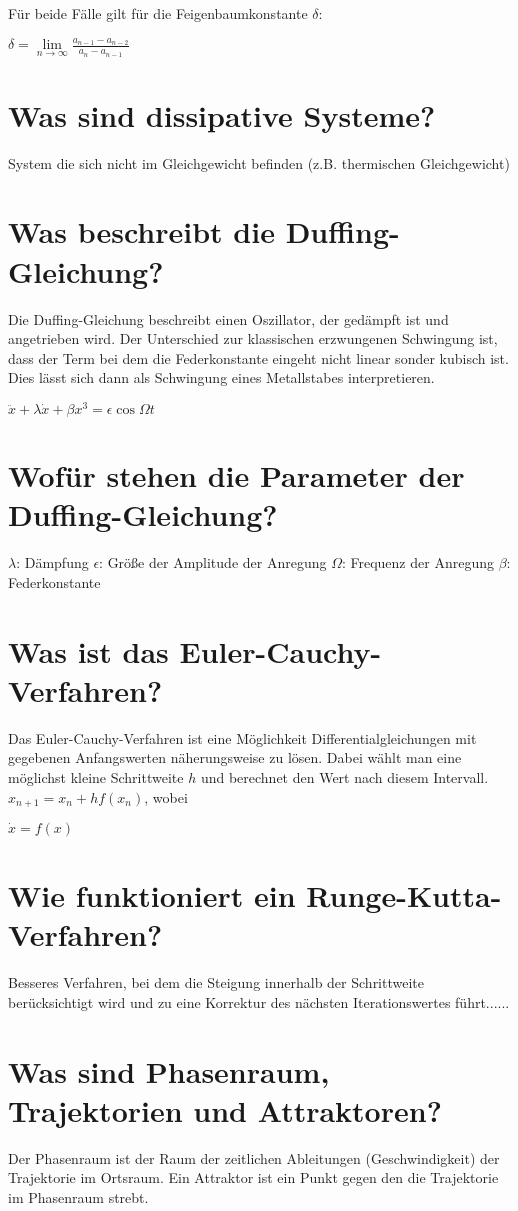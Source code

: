 \documentclass{scrartcl}
\begin{document}
Für beide Fälle gilt für die Feigenbaumkonstante $\delta$:

$\delta=\lim\limits_{n \rightarrow \infty}{\frac{a_{n-1}-a_{n-2}}{a_n-{a_{n-1}}}}$


\section{  Was sind dissipative Systeme?  }
System die sich nicht im Gleichgewicht befinden (z.B. thermischen Gleichgewicht)
\section{  Was beschreibt die Duffing-Gleichung?  }
Die Duffing-Gleichung beschreibt einen Oszillator, der gedämpft ist und angetrieben wird. Der Unterschied zur klassischen erzwungenen Schwingung ist, dass der Term bei dem die Federkonstante eingeht nicht linear sonder kubisch ist. Dies lässt sich dann als Schwingung eines Metallstabes interpretieren.

$\ddot{x}+\lambda\dot{x}+\beta x^3=\epsilon\cos{\Omega t}$

\section{  Wofür stehen die Parameter der Duffing-Gleichung?  }
$\lambda$: Dämpfung
\newline
$\epsilon$: Größe der Amplitude der Anregung
\newline
$\Omega$: Frequenz der Anregung
\newline
$\beta$: Federkonstante

\section{  Was ist das Euler-Cauchy-Verfahren?  }
Das Euler-Cauchy-Verfahren ist eine Möglichkeit Differentialgleichungen mit gegebenen Anfangswerten näherungsweise zu lösen. Dabei wählt man eine möglichst kleine Schrittweite $h$ und berechnet den Wert nach diesem Intervall.
$x_{n+1}=x_n +hf(x_n)$, wobei

$\dot{x}=f(x)$
\section{  Wie funktioniert ein Runge-Kutta-Verfahren?  }
Besseres Verfahren, bei dem die Steigung innerhalb der Schrittweite berücksichtigt wird und zu eine Korrektur des nächsten Iterationswertes führt......
\section{  Was sind Phasenraum, Trajektorien und Attraktoren?  }
Der Phasenraum ist der Raum der zeitlichen Ableitungen (Geschwindigkeit) der Trajektorie im Ortsraum. Ein Attraktor ist ein Punkt gegen den die Trajektorie im Phasenraum strebt.
\end{document}
